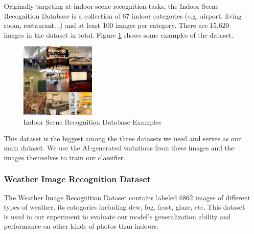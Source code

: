 \documentclass[11pt]{article}
\begin{document}
Originally targeting at indoor scene recognition tasks, the Indoor Scene Recognition Database is a collection of 67 indoor categories (e.g. airport, living room, restaurant...) and at least 100 images per category. There are 15,620 images in the dataset in total. Figure \ref{fig:paper_indoor_dataset} shows some examples of the dataset.

\begin{figure}[h]
  \centering
  \includegraphics[width=140]{./assets/paper_indoor_dataset.jpg}
  \caption{Indoor Scene Recognition Database Examples}
  \label{fig:paper_indoor_dataset}
\end{figure}

This dataset is the biggest among the three datasets we used and serves as our main dataset. We use the AI-generated variations from these images and the images themselves to train our classifier.

\subsubsection{Weather Image Recognition Dataset}

The Weather Image Recognition Dataset contains labeled 6862 images of different types of weather, its catogories including dew, fog, frost, glaze, etc. This dataset is used in our experiment to evaluate our model's generalization ability and performance on other kinds of photos than indoors.
\end{document}
